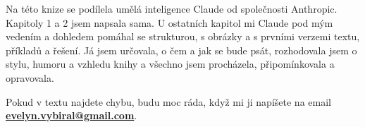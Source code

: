 Na této knize se podílela umělá inteligence Claude od společnosti Anthropic. Kapitoly 1 a 2 jsem napsala sama. U ostatních kapitol mi Claude pod mým vedením a dohledem pomáhal se strukturou, s obrázky a s prvními verzemi textu, příkladů a řešení. Já jsem určovala, o čem a jak se bude psát, rozhodovala jsem o stylu, humoru a vzhledu knihy a všechno jsem procházela, připomínkovala a opravovala.

Pokud v textu najdete chybu, budu moc ráda, když mi ji napíšete na email \textbf{\href{mailto: evelyn.vybiral@gmail.com}{evelyn.vybiral@gmail.com}}.
